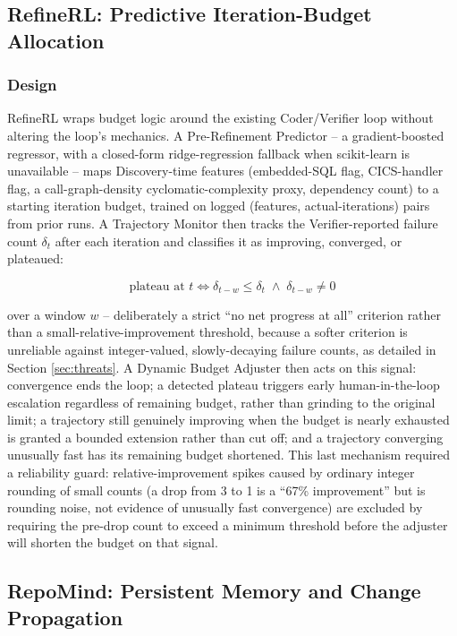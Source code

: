 \documentclass[conference]{IEEEtran}
\begin{document}
\subsection{RefineRL: Predictive Iteration-Budget Allocation}
\label{sec:refinerl}

\subsubsection{Design}
RefineRL wraps budget logic around the existing Coder/Verifier loop without
altering the loop's mechanics. A Pre-Refinement Predictor -- a
gradient-boosted regressor, with a closed-form ridge-regression fallback when
scikit-learn is unavailable -- maps Discovery-time features (embedded-SQL
flag, CICS-handler flag, a call-graph-density cyclomatic-complexity proxy,
dependency count) to a starting iteration budget, trained on logged
(features, actual-iterations) pairs from prior runs. A Trajectory Monitor
then tracks the Verifier-reported failure count $\delta_t$ after each
iteration and classifies it as improving, converged, or plateaued:

\begin{equation}
\text{plateau at } t \iff \delta_{t-w} \le \delta_t \;\wedge\; \delta_{t-w} \neq 0
\end{equation}

\noindent over a window $w$ -- deliberately a strict ``no net progress at
all'' criterion rather than a small-relative-improvement threshold, because a
softer criterion is unreliable against integer-valued, slowly-decaying
failure counts, as detailed in Section \ref{sec:threats}. A Dynamic Budget
Adjuster then acts on this signal: convergence ends the loop; a detected
plateau triggers early human-in-the-loop escalation regardless of remaining
budget, rather than grinding to the original limit; a trajectory still
genuinely improving when the budget is nearly exhausted is granted a bounded
extension rather than cut off; and a trajectory converging unusually fast has
its remaining budget shortened. This last mechanism required a
reliability guard: relative-improvement spikes caused by ordinary integer
rounding of small counts (a drop from 3 to 1 is a ``67\% improvement'' but is
rounding noise, not evidence of unusually fast convergence) are excluded by
requiring the pre-drop count to exceed a minimum threshold before the
adjuster will shorten the budget on that signal.

\subsection{RepoMind: Persistent Memory and Change Propagation}
\label{sec:repomind}
\end{document}
